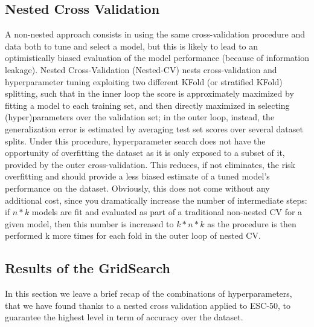 
\subsection{Nested Cross Validation}
\label{app:nested_CV}

A non-nested approach consists in using the same cross-validation procedure and data both to tune and select a model, but this is likely to lead to an optimistically biased evaluation of the model performance (because of information leakage). Nested Cross-Validation (Nested-CV) nests cross-validation and hyperparameter tuning exploiting two different KFold (or stratified KFold) splitting, such that in the inner loop the score is approximately maximized by fitting a model to each training set, and then directly maximized in selecting (hyper)parameters over the validation set; in the outer loop, instead, the generalization error is estimated by averaging test set scores over several dataset splits. Under this procedure, hyperparameter search does not have the opportunity of overfitting the dataset as it is only exposed to a subset of it, provided by the outer cross-validation. This reduces, if not eliminates, the risk overfitting and should provide a less biased estimate of a tuned model's performance on the dataset. Obviously, this does not come without any additional cost, since you dramatically increase the number of intermediate steps: if $n*k$ models are fit and evaluated as part of a traditional non-nested CV for a given model, then this number is increased to $k*n*k$ as the procedure is then performed k more times for each fold in the outer loop of nested CV.

\subsection{Results of the GridSearch}
\label{app:featclass_best_params}

In this section we leave a brief recap of the combinations of hyperparameters, that we have found thanks to a nested cross validation applied to ESC-50, to guarantee the highest level in term of accuracy over the dataset.

